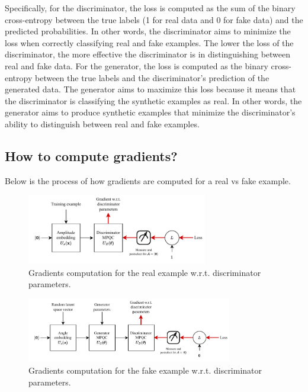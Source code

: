 Specifically, for the discriminator, the loss is computed as the sum of the binary cross-entropy between the true labels (1 for real data and 0 for fake data) and the predicted probabilities. In other words, the discriminator aims to minimize the loss when correctly classifying real and fake examples. The lower the loss of the discriminator, the more effective the discriminator is in distinguishing between real and fake data.
For the generator, the loss is computed as the binary cross-entropy between the true labels and the discriminator's prediction of the generated data. The generator aims to maximize this loss because it means that the discriminator is classifying the synthetic examples as real. In other words, the generator aims to produce synthetic examples that minimize the discriminator's ability to distinguish between real and fake examples.

\subsection{How to compute gradients?}
Below is the process of how gradients are computed for a real vs fake example.
\begin{figure}[H]
    \centering
    \includegraphics[width=0.7\textwidth]{figures/discrim_real.pdf}
    \caption{Gradients computation for the real example w.r.t. discriminator parameters.}
    \label{fig:bar_data}
\end{figure}

\begin{figure}[H]
    \centering
    \includegraphics[width=0.8\textwidth]{figures/discrim_fake.pdf}
    \caption{Gradients computation for the fake example w.r.t. discriminator parameters.}
    \label{fig:bar_data}
\end{figure}

